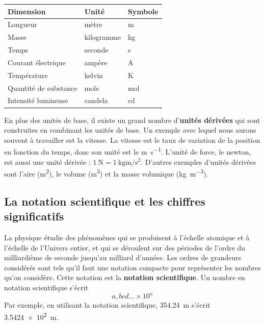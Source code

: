\vspace{0.3cm}
\begin{tabular}{lll}
  \toprule
  Dimension              &  Unité       &  Symbole \\
  \midrule
  Longueur               &  mètre       &  m       \\
  Masse                  &  kilogramme  &  kg      \\
  Temps                  &  seconde     &  s       \\
  Courant électrique     &  ampère      &  A       \\
  Température            &  kelvin      &  K       \\
  Quantité de substance  &  mole        &  mol     \\
  Intensité lumineuse    &  candela     &  cd      \\
  \bottomrule
\end{tabular}
\vspace{0.3cm}

En plus des unités de base, il existe un grand nombre d'\textbf{unités
  dérivées} qui sont construites en combinant les unités de base.  Un exemple
avec lequel nous aurons souvent à travailler est la vitesse.  La vitesse est le
taux de variation de la position en fonction du temps, donc son unité est le
\si{\meter\per\second}.  L'unité de force, le newton, est aussi une unité
dérivée : $\SI{1}{\newton} = \SI{1}{\kilogram\meter\per\second\squared}$.
D'autres exemples d'unités dérivées sont l'aire (\si{\meter\squared}), le
volume (\si{\meter\cubed}) et la masse volumique
(\si{\kilogram\per\meter\cubed}).


\subsection{La notation scientifique et les chiffres significatifs}

La physique étudie des phénomènes qui se produisent à l'échelle atomique et à
l'échelle de l'Univers entier, et qui se déroulent sur des périodes de l'ordre
du milliardième de seconde jusqu'au milliard d'années.  Les ordres de grandeurs
considérés sont tels qu'il faut une notation compacte pour représenter les
nombres qu'on considère.  Cette notation est la \textbf{notation scientifique}.
Un nombre en notation scientifique s'écrit
\begin{equation*}
  a,bcd\ldots \times 10^n
\end{equation*}
Par exemple, en utilisant la notation scientifique, \SI{354.24}{\meter} s'écrit
\SI{3.5424e2}{\meter}.

